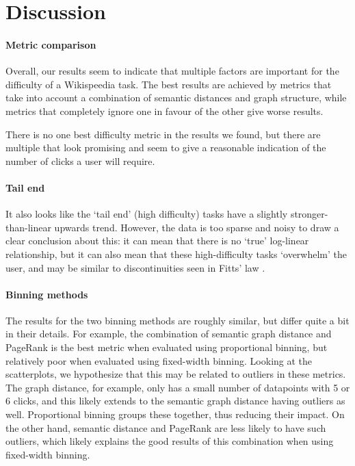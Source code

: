 \section{Discussion}
\label{sec:discussion}
\paragraph{Metric comparison}
Overall, our results seem to indicate that multiple factors are important for the difficulty of a Wikispeedia task. The best results are achieved by metrics that take into account a combination of semantic distances and graph structure, while metrics that completely ignore one in favour of the other give worse results.

There is no one best difficulty metric in the results we found, but there are multiple that look promising and seem to give a reasonable indication of the number of clicks a user will require.

\paragraph{Tail end}
It also looks like the `tail end' (high difficulty) tasks have a slightly stronger-than-linear upwards trend. However, the data is too sparse and noisy to draw a clear conclusion about this: it can mean that there is no `true' log-linear relationship, but it can also mean that these high-difficulty tasks `overwhelm' the user, and may be similar to discontinuities seen in Fitts' law \cite{Huys2010,SleimenMalkoun2012}.

\paragraph{Binning methods}
The results for the two binning methods are roughly similar, but differ quite a bit in their details. For example, the combination of semantic graph distance and PageRank is the best metric when evaluated using proportional binning, but relatively poor when evaluated using fixed-width binning. Looking at the scatterplots, we hypothesize that this may be related to outliers in these metrics. The graph distance, for example, only has a small number of datapoints with 5 or 6 clicks, and this likely extends to the semantic graph distance having outliers as well. Proportional binning groups these together, thus reducing their impact. On the other hand, semantic distance and PageRank are less likely to have such outliers, which likely explains the good results of this combination when using fixed-width binning.

